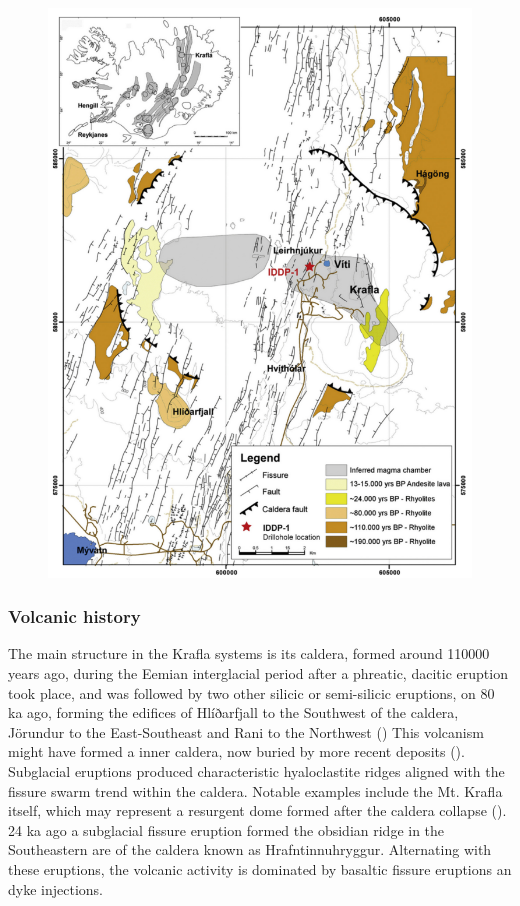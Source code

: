 \begin{figure}
    \centering
    \includegraphics[width=1\linewidth]{img/chapter1/Krafla_1.png}
    \caption{\cite{masotta2018}}
    \label{fig:krafla_map}
\end{figure}

\subsubsection{Volcanic history}
The main structure in the Krafla systems is its caldera, formed around 110000 years ago, during the Eemian interglacial period after a phreatic, dacitic eruption took place, and was followed by two other silicic or semi-silicic eruptions, on 80 ka ago, forming the edifices of Hlíðarfjall to the Southwest of the caldera, Jörundur to the East-Southeast and Rani to the Northwest (\cite{sæmundsson1991}) This volcanism might have formed a inner caldera, now buried by more recent deposits (\cite{arnason2020}). Subglacial eruptions produced characteristic hyaloclastite ridges aligned with the fissure swarm trend within the caldera. Notable examples include the Mt. Krafla itself, which may represent a resurgent dome formed after the caldera collapse (\cite{castillo2021}). 24 ka ago a subglacial fissure eruption formed the obsidian ridge in the Southeastern are of the caldera known as Hrafntinnuhryggur. Alternating with these eruptions, the volcanic activity is dominated by basaltic fissure eruptions an dyke injections.

